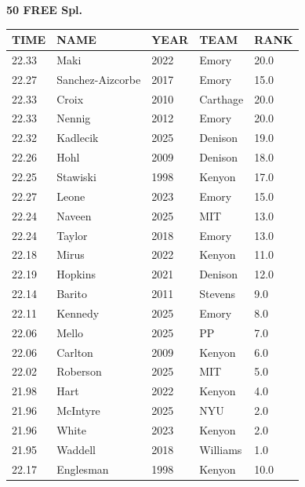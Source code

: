 \begin{table}[H]
\centering
\begin{minipage}[t]{0.6\textwidth}
\centering
\textbf{50 FREE Spl.}\\[0.1cm]
\begin{tabular}{@{}p{1.8cm}p{2.8cm}p{1.2cm}p{1.4cm}p{0.8cm}@{}}
\hline
    \textbf{TIME} & \textbf{NAME} & \textbf{YEAR} & \textbf{TEAM} & \textbf{RANK} \\
\hline
    22.33 & Maki & 2022 & Emory & 20.0 \\
    22.27 & Sanchez-Aizcorbe & 2017 & Emory & 15.0 \\
    22.33 & Croix & 2010 & Carthage & 20.0 \\
    22.33 & Nennig & 2012 & Emory & 20.0 \\
    22.32 & Kadlecik & 2025 & Denison & 19.0 \\
    22.26 & Hohl & 2009 & Denison & 18.0 \\
    22.25 & Stawiski & 1998 & Kenyon & 17.0 \\
    22.27 & Leone & 2023 & Emory & 15.0 \\
    22.24 & Naveen & 2025 & MIT & 13.0 \\
    22.24 & Taylor & 2018 & Emory & 13.0 \\
    22.18 & Mirus & 2022 & Kenyon & 11.0 \\
    22.19 & Hopkins & 2021 & Denison & 12.0 \\
    22.14 & Barito & 2011 & Stevens & 9.0 \\
    22.11 & Kennedy & 2025 & Emory & 8.0 \\
    22.06 & Mello & 2025 & PP & 7.0 \\
    22.06 & Carlton & 2009 & Kenyon & 6.0 \\
    22.02 & Roberson & 2025 & MIT & 5.0 \\
    21.98 & Hart & 2022 & Kenyon & 4.0 \\
    21.96 & McIntyre & 2025 & NYU & 2.0 \\
    21.96 & White & 2023 & Kenyon & 2.0 \\
    21.95 & Waddell & 2018 & Williams & 1.0 \\
    22.17 & Englesman & 1998 & Kenyon & 10.0 \\
\hline
\end{tabular}
\end{minipage}
\end{table}

